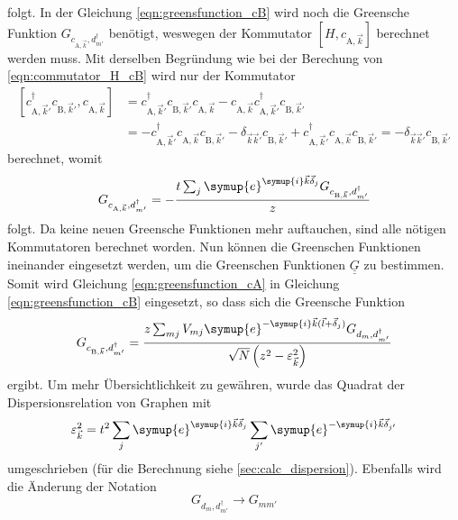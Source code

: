 folgt.
In der Gleichung \eqref{eqn:greensfunction_cB} wird noch die Greensche Funktion $G_{c_{\text{A},\vec{k}},d^\dagger_{m'}}$ benötigt, weswegen der Kommutator
$\left [H, c_{\text{A},\vec{k}} \right ]$ berechnet werden muss.
Mit derselben Begründung wie bei der Berechung von \eqref{eqn:commutator_H_cB} wird nur der Kommutator
\begin{align*}
    \left [ c^\dagger_{\text{A},\vec{k}'} c_{\text{B},\vec{k}'}, c_{\text{A},\vec{k}} \right ]  &= c^\dagger_{\text{A},\vec{k}'}  c_{\text{B},\vec{k}'} c_{\text{A},\vec{k}}
    - c_{\text{A},\vec{k}} c^\dagger_{\text{A},\vec{k}'} c_{\text{B},\vec{k}'} \\
    &= - c^\dagger_{\text{A},\vec{k}'}  c_{\text{A},\vec{k}} c_{\text{B},\vec{k}'} - \delta_{\vec{k}\vec{k}'} c_{\text{B},\vec{k}'} 
    + c^\dagger_{\text{A},\vec{k}'} c_{\text{A},\vec{k}} c_{\text{B},\vec{k}'} = - \delta_{\vec{k}\vec{k}'} c_{\text{B},\vec{k}'} 
\end{align*}
berechnet, womit 
\begin{equation}
    G_{c_{\text{A},\vec{k}},d^\dagger_{m'}} = - \frac{t \sum_{j}\symup{e}^{\symup{i}\vec{k}\vec{\delta}_j} G_{c_{\text{B},\vec{k}}, d^\dagger_{m'}}} {z} \label{eqn:greensfunction_cA}
\end{equation}
folgt.
Da keine neuen Greensche Funktionen mehr auftauchen, sind alle nötigen Kommutatoren berechnet worden. 
Nun können die Greenschen Funktionen ineinander eingesetzt werden, um die Greenschen Funktionen $\underline{\underline{G}}$ zu bestimmen.
Somit wird Gleichung \eqref{eqn:greensfunction_cA} in Gleichung \eqref{eqn:greensfunction_cB} eingesetzt, so dass sich die Greensche Funktion
\begin{equation}
    G_{c_{\text{B},\vec{k}}, d^\dagger_{m'}} = \frac{z\sum_{mj} V_{mj} \symup{e}^{-\symup{i}\vec{k} (\vec{l}+\vec{\delta}_j)} G_{d_m, d_{m'}^\dagger}}
    {\sqrt{N}\left ( z^2-\varepsilon_{\vec{k}}^2 \right )} \label{eqn:finalgreencB}
\end{equation}
ergibt.
Um mehr Übersichtlichkeit zu gewähren, wurde das Quadrat der Dispersionsrelation von Graphen mit
\begin{equation*}
     \varepsilon_{\vec{k}}^2 = t^2 \sum_j \symup{e}^{\symup{i}\vec{k}\vec{\delta}_j} \sum_{j'} \symup{e}^{-\symup{i}\vec{k}\vec{\delta}_{j'}} 
\end{equation*}  
umgeschrieben (für die Berechnung siehe \ref{sec:calc_dispersion}).
Ebenfalls wird die Änderung der Notation 
\begin{equation*}
    G_{d_m, d^\dagger_{m'}} \to G_{mm'}
\end{equation*}
